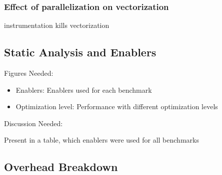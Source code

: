 \subsubsection{Effect of parallelization on vectorization}

instrumentation kills vectorization


\subsection{Static Analysis and Enablers}
Figures Needed:
\begin{itemize}

\item Enablers: Enablers used for each benchmark
\item Optimization level: Performance with different optimization levels
\end{itemize}

Discussion Needed:

Present in a table, which enablers were used for all benchmarks

\subsection{Overhead Breakdown}

